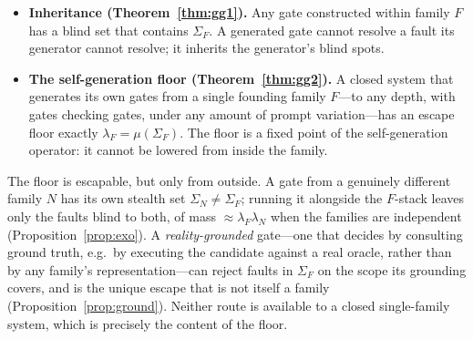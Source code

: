 \documentclass[11pt]{article}
\theoremstyle{definition}
\theoremstyle{remark}
\newcommand{\SigF}{\Sigma_{F}}
\newcommand{\SigN}{\Sigma_{N}}
\newcommand{\lF}{\lambda_{F}}
\newcommand{\lN}{\lambda_{N}}
\begin{document}
\begin{itemize}[leftmargin=1.4em,itemsep=2pt]
\item \textbf{Inheritance (Theorem~\ref{thm:gg1}).} Any gate constructed within family $F$ has a
blind set that contains $\SigF$. A generated gate cannot resolve a fault its generator cannot
resolve; it inherits the generator's blind spots.
\item \textbf{The self-generation floor (Theorem~\ref{thm:gg2}).} A closed system that generates its
own gates from a single founding family $F$---to any depth, with gates checking gates, under any
amount of prompt variation---has an escape floor exactly $\lF=\mu(\SigF)$. The floor is a fixed point
of the self-generation operator: it cannot be lowered from inside the family.
\end{itemize}

\noindent The floor is escapable, but only from outside. A gate from a genuinely different family $N$
has its own stealth set $\SigN\neq\SigF$; running it alongside the $F$-stack leaves only the faults
blind to both, of mass $\approx\lF\lN$ when the families are independent (Proposition~\ref{prop:exo}).
A \emph{reality-grounded} gate---one that decides by consulting ground truth, e.g.\ by executing the
candidate against a real oracle, rather than by any family's representation---can reject faults in
$\SigF$ on the scope its grounding covers, and is the unique escape that is not itself a
family (Proposition~\ref{prop:ground}). Neither route is available to a closed single-family system,
which is precisely the content of the floor.
\end{document}
